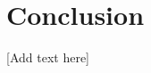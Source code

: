 \documentclass[11pt,letterpaper]{article}
\begin{document}
\section{Conclusion}
[Add text here]


\vspace{-0.25in}

{\parindent -10pt\leftskip 10pt\noindent



}

\end{document}
